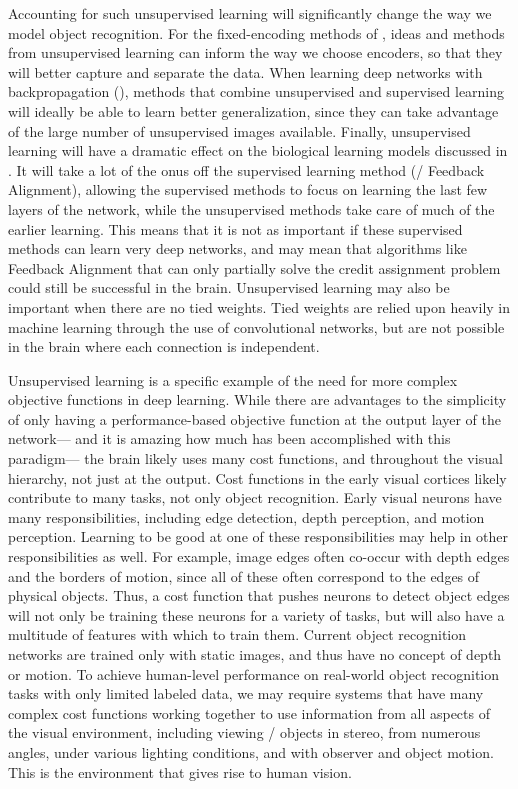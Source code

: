 Accounting for such unsupervised learning will
significantly change the way we model object recognition.
For the fixed-encoding methods of ,
ideas and methods from unsupervised learning
can inform the way we choose encoders,
so that they will better capture and separate the data.
When learning deep networks with backpropagation (),
methods that combine unsupervised and supervised learning
will ideally be able to learn better generalization,
since they can take advantage of the large number of unsupervised images available.
Finally, unsupervised learning will have a dramatic effect
on the biological learning models discussed in .
It will take a lot of the onus off the supervised learning method (\eg/ Feedback Alignment),
allowing the supervised methods to focus on learning the last few layers of the network,
while the unsupervised methods take care of much of the earlier learning.
This means that it is not as important if these supervised methods
can learn very deep networks,
and may mean that algorithms like Feedback Alignment
that can only partially solve the credit assignment problem
could still be successful in the brain.
Unsupervised learning may also be important when there are no tied weights.
Tied weights are relied upon heavily in machine learning
through the use of convolutional networks,
but are not possible in the brain where each connection is independent.

Unsupervised learning is a specific example of the need for
more complex objective functions in deep learning.
While there are advantages to the simplicity of
only having a performance-based objective function
at the output layer of the network---%
and it is amazing how much has been accomplished with this paradigm---%
the brain likely uses many cost functions,
and throughout the visual hierarchy, not just at the output.
Cost functions in the early visual cortices likely contribute to many tasks,
not only object recognition.
Early visual neurons have many responsibilities,
including edge detection, depth perception, and motion perception.
Learning to be good at one of these responsibilities
may help in other responsibilities as well.
For example, image edges often co-occur with depth edges and
the borders of motion,
since all of these often correspond to the edges of physical objects.
Thus, a cost function that pushes neurons to detect object edges
will not only be training these neurons for a variety of tasks,
but will also have a multitude of features with which to train them.
Current object recognition networks are trained only with static images,
and thus have no concept of depth or motion.
To achieve human-level performance on real-world object recognition tasks
with only limited labeled data,
we may require systems that have many complex cost functions
working together to use information from all aspects of the visual environment,
including viewing \ddd/ objects in stereo,
from numerous angles, under various lighting conditions,
and with observer and object motion.
This is the environment that gives rise to human vision.

